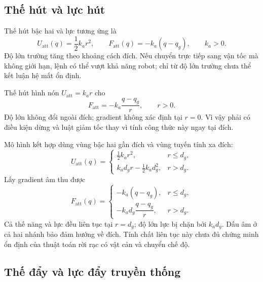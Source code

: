 \documentclass[12pt,a4paper,oneside]{report}
\numberwithin{equation}{chapter}
\newcommand{\att}{\mathrm{att}}
\begin{document}
\subsection{Thế hút và lực hút}

Thế hút bậc hai và lực tương ứng là
\begin{equation}
U_{\att}(q)=\frac12 k_a r^2,\qquad
F_{\att}(q)=-k_a(q-q_g),\qquad k_a>0.
\end{equation}
Độ lớn trường tăng theo khoảng cách đích. Nếu chuyển trực tiếp sang vận tốc mà không giới hạn, lệnh có thể vượt khả năng robot; chỉ từ độ lớn trường chưa thể kết luận hệ mất ổn định.

Thế hút hình nón $U_{\att}=k_a r$ cho
\begin{equation}
F_{\att}=-k_a\frac{q-q_g}{r},\qquad r>0.
\end{equation}
Độ lớn không đổi ngoài đích; gradient không xác định tại $r=0$. Vì vậy phải có điều kiện dừng và luật giảm tốc thay vì tính công thức này ngay tại đích.

Mô hình kết hợp dùng vùng bậc hai gần đích và vùng tuyến tính xa đích:
\begin{equation}
U_{\att}(q)=\begin{cases}
\frac12 k_a r^2,&r\le d_g,\\
k_a d_g r-\frac12 k_a d_g^2,&r>d_g.
\end{cases}
\end{equation}
Lấy gradient âm thu được
\begin{equation}
F_{\att}(q)=\begin{cases}
-k_a(q-q_g),&r\le d_g,\\
-k_a d_g\dfrac{q-q_g}{r},&r>d_g.
\end{cases}
\label{eq:attractive}
\end{equation}
Cả thế năng và lực đều liên tục tại $r=d_g$; độ lớn lực bị chặn bởi $k_a d_g$. Dấu âm ở cả hai nhánh bảo đảm hướng về đích. Tính chất liên tục này chưa đủ chứng minh ổn định của thuật toán rời rạc có vật cản và chuyển chế độ.

\subsection{Thế đẩy và lực đẩy truyền thống}
\end{document}

